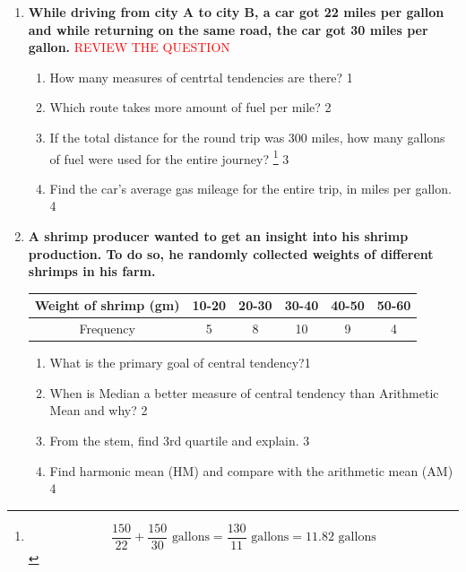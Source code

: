 \documentclass[a4paper,oneside]{book}
\begin{document}
\begin{enumerate}
\begin{center}
\begin{tikzpicture}
\end{tikzpicture}
  \end{center}
  \begin{enumerate}
    \item
	What is the formula of harmonic mean? \hfill 1
    \item
	When should we use the harmonic mean? \hfill 2
    \item  
	Find the average velocity of the vehicle. \hfill 3
    \item
	Compare the average speed estimated using the arithmetic and harmonic mean and \\ verify their suitability in the given situation. \hfill 4
  \end{enumerate}


 \item
	  \textbf{While driving from city A to city B, a car got 22 miles per gallon and
while returning on the same road, the car got 30 miles per gallon.} 
  \textcolor{red}{REVIEW THE QUESTION}
  \begin{enumerate}
    \item
	How many measures of centrtal tendencies are there? \hfill 1
    \item
	Which route takes more amount of fuel per mile? \hfill 2
    \item  
	If the total distance for the round trip was 300 miles, how many gallons of fuel were used for the entire journey? \footnote{$$\frac{150}{22} + \frac{150}{30} \text{ gallons} = \frac{130}{11} \text{ gallons} = 11.82 \text{ gallons}$$} \hfill 3
    \item
	Find the car’s average gas mileage for the entire trip, in miles per gallon. \hfill 4
  \end{enumerate}

     \item
	  \textbf{A shrimp producer wanted to get an insight into his shrimp production. To do so, he randomly collected weights of different shrimps in his farm.} 
	  

	  \begin{table}[h]
	  \centering
\begin{tabular}{c|c|c|c|c|c}
Weight of shrimp (gm) & 10-20 & 20-30 & 30-40 & 40-50 & 50-60 \\ \hline
Frequency & 5 & 8 & 10 & 9 & 4
\end{tabular}
\end{table}

  \begin{enumerate}
    \item
	What is the primary goal of central tendency?\hfill 1
    \item
	When is Median a better measure of central tendency than Arithmetic Mean and why? \hfill 2
    \item  
	From the stem, find 3rd quartile and explain. \hfill 3
    \item
	Find harmonic mean (HM) and compare with the arithmetic mean (AM) \hfill 4
  \end{enumerate}


\end{enumerate}
\end{document}
